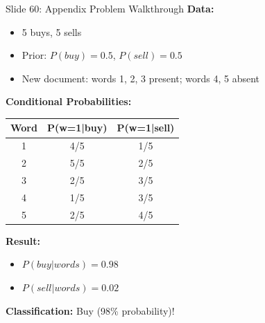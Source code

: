 \documentclass[8pt]{beamer}
\begin{document}
	\begin{frame}{Slide 60: Appendix Problem Walkthrough}
		\fontsize{6.5}{7.5}\selectfont
		\textbf{Data:}
		\begin{itemize}
			\item 5 buys, 5 sells
			\item Prior: $P(buy) = 0.5$, $P(sell) = 0.5$
			\item New document: words 1, 2, 3 present; words 4, 5 absent
		\end{itemize}
		
		\vspace{0.1cm}
		\textbf{Conditional Probabilities:}
		\begin{tabular}{|c|c|c|}
			\hline
			Word & P(w=1|buy) & P(w=1|sell) \\
			\hline
			1 & 4/5 & 1/5 \\
			2 & 5/5 & 2/5 \\
			3 & 2/5 & 3/5 \\
			4 & 1/5 & 3/5 \\
			5 & 2/5 & 4/5 \\
			\hline
		\end{tabular}
		
		\vspace{0.1cm}
		\textbf{Result:}
		\begin{itemize}
			\item $P(buy|words) = 0.98$
			\item $P(sell|words) = 0.02$
		\end{itemize}
		
		\textcolor{myblue}{\textbf{Classification:}} Buy (98\% probability)!
	\end{frame}
	
	
\end{document}
